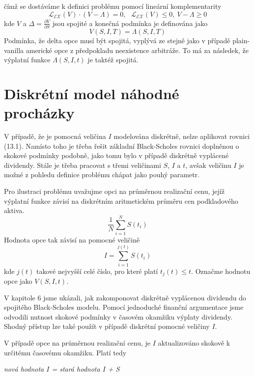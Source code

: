 \documentclass[a4paper]{book}
\begin{document}
čímž se dostáváme k definici problému pomocí lineární komplementarity
\begin{equation}
\mathcal{L}_{\mathcal{EX}}(V) \cdot (V - \Lambda) = 0, ~~~ \mathcal{L}_{\mathcal{EX}}(V) \le 0, ~ V - \Lambda \ge 0
\end{equation}
kde $V$ a $\Delta = \frac{\partial V}{\partial S}$ jsou spojité a konečná podmínka je definována jako
\begin{equation*}
V(S,I,T) = \Lambda(S,I,T)
\end{equation*}
Podmínka, že delta opce musí být spojitá, vyplývá ze stejně jako v případě plain-vanilla americké opce z předpokladu neexistence arbitráže. To má za následek, že výplatní funkce $\Lambda(S,I,t)$ je taktéž spojitá.

\section{Diskrétní model náhodné procházky}

V případě, že je pomocná veličina $I$ modelována diskrétně, nelze aplikovat rovnici (13.1). Namísto toho je třeba řešit základní Black-Scholes rovnici doplněnou o skokové podmínky podobně, jako tomu bylo v případě diskrétně vyplácené dividendy. Stále je třeba pracovat s třemi veličinami $S$, $I$ a $t$, avšak veličinu $I$ je možné z pohledu definice problému chápat jako pouhý parametr.

Pro ilustraci problému uvažujme opci na průměrnou realizační cenu, jejíž výplatní funkce závisí na diskrétním aritmetickém průměru cen podkladového aktiva.
\begin{equation*}
\frac{1}{N} \sum_{i=1}^N S(t_i)
\end{equation*}
Hodnota opce tak závisí na pomocné veličině
\begin{equation}
I = \sum_{i=1}^{j(t)}S(t_i)
\end{equation}
kde $j(t)$ takové nejvyšší celé číslo, pro které platí $t_j(t) \le t$. Označme hodnotu opce jako $V(S,I,t)$.

V kapitole 6 jsme ukázali, jak zakomponovat diskrétně vyplácenou dividendu do spojitého Black-Scholes modelu. Pomocí jednoduché finanční argumentace jsme odvodili nutnost skokové podmínky v časovém okamžiku výplaty dividendy. Shodný přístup lze také použít v případě diskrétní pomocné veličiny $I$.

V případě opce na průměrnou realizační cenu, je $I$ aktualizováno skokově k určitému časovému okamžiku. Platí tedy
\begin{center}
\textit{nová hodnota $I$ = stará hodnota $I$ + S}
\end{center}
\end{document}
